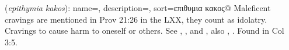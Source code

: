 \item[Maleficent craving,]

(\textit{epithymia kakos}):
{
    name=,
    description={},
    sort=επιθυμια κακος@
}
Maleficent cravings are mentioned in Prov 21:26 in the LXX, they count as idolatry. Cravings to cause harm to oneself or others. See , , and , also , .
Found in Col 3:5.
